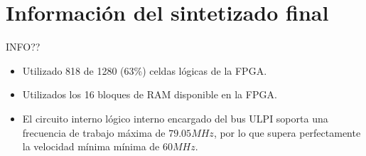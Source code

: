 \section{Información del sintetizado final}
INFO??

\begin{itemize}
    \item Utilizado 818 de 1280 (63\%) celdas lógicas de la FPGA.
    \item Utilizados los 16 bloques de RAM disponible en la FPGA.
    \item El circuito interno lógico interno encargado del bus ULPI soporta una frecuencia de trabajo máxima de $79.05MHz$, por lo que supera perfectamente la velocidad mínima mínima de $60MHz$.
\end{itemize}


